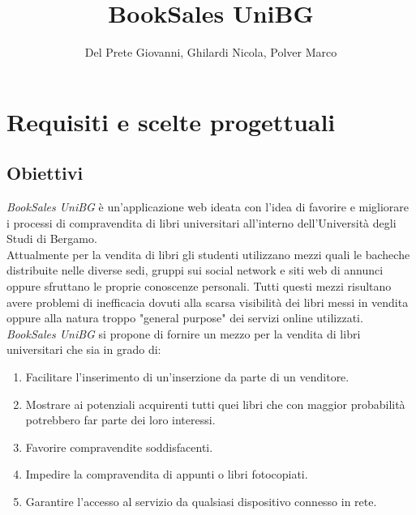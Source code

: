 \documentclass[10pt,a4paper]{report}
\author{Del Prete Giovanni, Ghilardi Nicola, Polver Marco}
\title{BookSales UniBG}
\begin{document}
	
	\maketitle
	\tableofcontents
	
	\section{Requisiti e scelte progettuali}
	\subsection{Obiettivi}
	\textit{BookSales UniBG} è un'applicazione web ideata con l'idea di favorire e migliorare i processi di compravendita di libri universitari all'interno dell'Università degli Studi di Bergamo. 
	\\
	Attualmente per la vendita di libri gli studenti utilizzano mezzi quali le bacheche distribuite nelle diverse sedi, gruppi sui social network e siti web di annunci oppure sfruttano le proprie conoscenze personali. Tutti questi mezzi risultano avere problemi di inefficacia dovuti alla scarsa visibilità dei libri messi in vendita oppure alla natura troppo "general purpose" dei servizi online utilizzati.\\
	\textit{BookSales UniBG} si propone di fornire un mezzo per la vendita di libri universitari che sia in grado di:
	\begin{enumerate}
		\item Facilitare l'inserimento di un'inserzione da parte di un venditore.
		\item Mostrare ai potenziali acquirenti tutti quei libri che con maggior probabilità potrebbero far parte dei loro interessi.
		\item Favorire compravendite soddisfacenti.
		\item Impedire la compravendita di appunti o libri fotocopiati.
		\item Garantire l'accesso al servizio da qualsiasi dispositivo connesso in rete.
	\end{enumerate}
\end{document}
